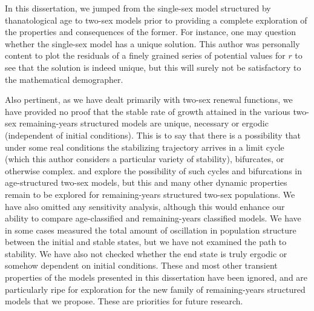 
In this dissertation, we jumped from the single-sex model structured by
thanatological age to two-sex models prior to providing a complete
exploration of the properties and consequences of the former. For instance, one
may question whether the single-sex model has a unique solution. This author was
personally content to plot the residuals of a finely grained series of potential
values for $r$ to see that the solution is indeed unique, but
this will surely not be satisfactory to the mathematical demographer.

Also pertinent, as we have dealt primarily with two-sex renewal functions,
we have provided no proof that the stable rate of growth attained in the various
two-sex remaining-years structured models are unique, necessary or ergodic (independent of initial conditions).
This is to say that there is a possibility that under some real conditions the
stabilizing trajectory arrives in a limit cycle (which this
author considers a particular variety of stability), bifurcates, or otherwise
complex. \citet{wijewickrema1980weak} and \citet{chung1990phd, chung1994cycles}
explore the possibility of such cycles and bifurcations in age-structured
two-sex models, but this and many other dynamic properties remain to be explored for remaining-years structured two-sex
populations. We have also omitted any sensitivity analysis, although this would
enhance our ability to compare age-classified and remaining-years
classified models. We have in some cases measured the total amount of
oscillation in population structure between the initial and stable states, but
we have not examined the path to stability. We have also not checked whether the
end state is truly ergodic or somehow dependent on initial conditions. These and most
other transient properties of the models presented in this dissertation have
been ignored, and are particularly ripe for exploration for the new family of
remaining-years structured models that we propose. These are priorities for
future research.


